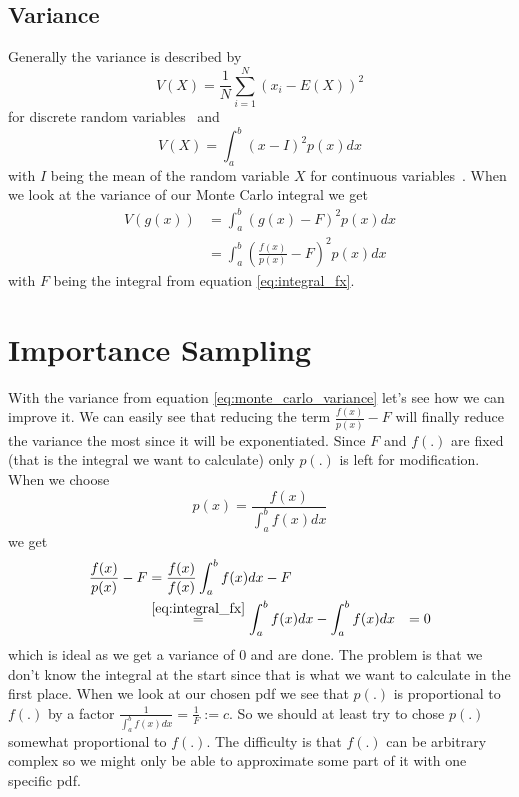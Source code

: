 \subsection{Variance}
\label{sec:variance}
Generally the variance is described by $$ V(X) = \frac{1}{N} \sum_{i = 1}^N (x_i - E(X))^2 $$ for discrete random variables~\cite{pris}
and $$ V(X) = \int_{a}^b (x - I)^2 p(x) dx $$ with $ I $ being the mean of the random variable $ X $ for continuous variables~\cite{wyzant}.
When we look at the variance of our Monte Carlo integral we get
\begin{equation}
\label{eq:monte_carlo_variance}
\begin{aligned}
    V(g(x)) &= \int_{a}^b (g(x) - F)^2 p(x) dx \\
            &= \int_{a}^b \left(\frac{f(x)}{p(x)} - F\right)^2 p(x) dx
\end{aligned}
\end{equation}
with $ F $ being the integral from equation \ref{eq:integral_fx}.


\section{Importance Sampling}
\label{sec:importance_sampling}
With the variance from equation \ref{eq:monte_carlo_variance} let's see how we can improve it.
We can easily see that reducing the term $ \frac{f(x)}{p(x)} - F $ will finally reduce the variance the most since it will be exponentiated.
Since $ F $ and $ f(.) $ are fixed (that is the integral we want to calculate) only $ p(.) $ is left for modification.
When we choose $$ p(x) = \frac{f(x)}{\int_{a}^b f(x) dx} $$ we get
\begin{equation}
\label{eq:zero_variance}
\begin{aligned}
    \frac{f(x)}{p(x)} - F &= \frac{f(x)}{f(x)}\int_{a}^b f(x) dx - F \\
        &\stackrel{\ref{eq:integral_fx}}{=} \int_{a}^b f(x) dx - \int_{a}^b f(x) dx
        &= 0
\end{aligned}
\end{equation}
which is ideal as we get a variance of 0 and are done.
The problem is that we don't know the integral at the start since that is what we want to calculate in the first place.
When we look at our chosen pdf we see that $ p(.) $ is proportional to $ f(.) $ by a factor $ \frac{1}{\int_{a}^b f(x) dx} = \frac{1}{F} := c $.
So we should at least try to chose $ p(.) $ somewhat proportional to $ f(.) $.
The difficulty is that $ f(.) $ can be arbitrary complex so we might only be able to approximate some part of it with one specific pdf.


